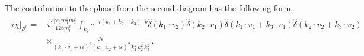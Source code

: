 The contribution to the phase from the second diagram has the following form,
\begin{align}
\begin{split}
i \chi\Big|_{\mathcal{S}^0}
=&\,i\frac{s_1^3 s_2^3 m_1^2 m_2^2} {128 m_p^6} \int_{k_i}e^{-i(k_1+k_2+k_3)\cdot b}\hat\delta(k_1\cdot v_2)\hat\delta(k_2\cdot v_1)\hat\delta(k_1\cdot v_1+k_3\cdot v_1)\hat\delta(k_2\cdot v_2+k_3\cdot v_2)\\
&\times\frac{\mathcal{N}}{(k_1\cdot v_1+i\varepsilon)^2(k_3\cdot v_2+i\varepsilon)^2\,k_1^2 \,k_2^2\,k_3^2}\,.
\end{split}
\end{align}
